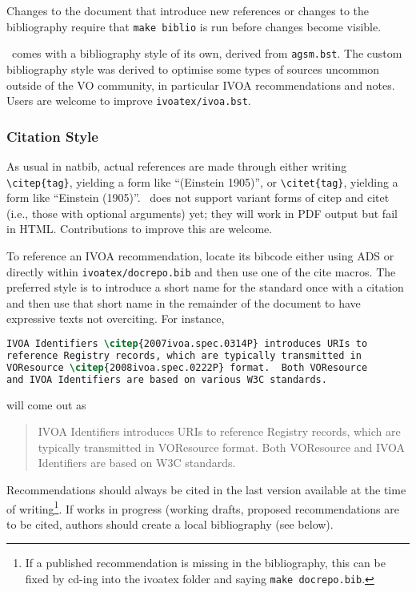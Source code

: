 \documentclass[11pt,a4paper]{ivoa}
\begin{document}
Changes to the document that introduce new references or changes to the
bibliography require that \texttt{make biblio} is run before changes
become visible.

\ivoatex\ comes with a bibliography style of its own, derived from
\texttt{agsm.bst}.  The custom bibliography style was derived to
optimise some types of sources uncommon outside of the VO community, in
particular IVOA recommendations and notes.  Users are welcome to improve
\texttt{ivoatex/ivoa.bst}.

\subsubsection{Citation Style}

As usual in natbib, actual references are made through either writing
\verb|\citep{tag}|, yielding a form like ``(Einstein 1905)'',
or \verb|\citet{tag}|, yielding a form like ``Einstein (1905)''.
\ivoatex\ does not support variant forms of citep and citet (i.e., those
with optional arguments) yet; they will work in PDF output but fail in
HTML.  Contributions to improve this are welcome.

To reference an IVOA recommendation, locate its bibcode either using ADS
or directly within \texttt{ivoatex/docrepo.bib} and then use one of the
cite macros.  The preferred style is to introduce a short name for the
standard once with a citation and then use that short name in the
remainder of the document to have expressive texts not overciting. For
instance,

\begin{lstlisting}[language=tex]
IVOA Identifiers \citep{2007ivoa.spec.0314P} introduces URIs to
reference Registry records, which are typically transmitted in
VOResource \citep{2008ivoa.spec.0222P} format.  Both VOResource 
and IVOA Identifiers are based on various W3C standards.
\end{lstlisting}

will come out as

\begin{quotation}
IVOA Identifiers \citep{2007ivoa.spec.0314P} introduces URIs to
reference Registry records, which are typically transmitted in
VOResource \citep{2008ivoa.spec.0222P} format.  Both VOResource and IVOA
Identifiers are based on W3C standards.
\end{quotation}

Recommendations should always be cited in the last version available
at the time of writing\footnote{If a published recommendation is missing
in the bibliography, this can be fixed by cd-ing into the ivoatex folder
and saying \texttt{make docrepo.bib}.}.  If works in progress (working
drafts, proposed recommendations are to be cited, authors should create
a local bibliography (see below).
\end{document}
